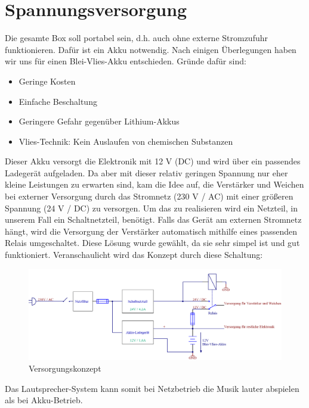 \section{Spannungsversorgung}\label{sec:3.4}
Die gesamte Box soll portabel sein, d.h. auch ohne externe Stromzufuhr funktionieren.
Dafür ist ein Akku notwendig.
Nach einigen Überlegungen haben wir uns für einen Blei-Vlies-Akku entschieden.
Gründe dafür sind:
\begin{itemize}
	\item Geringe Kosten
	\item Einfache Beschaltung
	\item Geringere Gefahr gegenüber Lithium-Akkus
	\item Vlies-Technik: Kein Auslaufen von chemischen Substanzen
\end{itemize}
Dieser Akku versorgt die Elektronik mit 12 V (DC) und wird über ein passendes Ladegerät aufgeladen.
Da aber mit dieser relativ geringen Spannung nur eher kleine Leistungen zu erwarten sind, kam die Idee auf, die Verstärker und Weichen bei externer Versorgung durch das Stromnetz (230 V / AC) mit einer größeren Spannung (24 V / DC) zu versorgen.
Um das zu realisieren wird ein Netzteil, in unserem Fall ein Schaltnetzteil, benötigt.
Falls das Gerät am externen Stromnetz hängt, wird die Versorgung der Verstärker automatisch mithilfe eines passenden Relais umgeschaltet.
Diese Lösung wurde gewählt, da sie sehr simpel ist und gut funktioniert.
Veranschaulicht wird das Konzept durch diese Schaltung:
\begin{figure} [H]
	\centering	
	\includegraphics[width=1\textwidth]{img/Grundlagen/VersorgungV2.png}
	\caption{Versorgungskonzept}
	\label {fig:3.4.1}
\end{figure}
Das Lautsprecher-System kann somit bei Netzbetrieb die Musik lauter abspielen als bei Akku-Betrieb.

